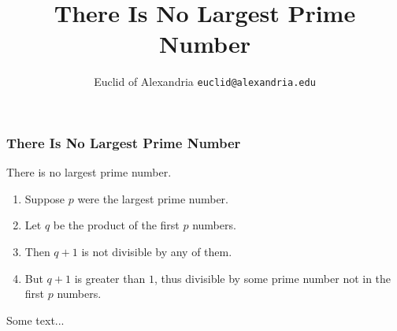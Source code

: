 \documentclass[aspectratio=169,10pt,handout]{beamer}
\title{There Is No Largest Prime Number}
\author[Euclid]{Euclid of Alexandria \texttt{euclid@alexandria.edu}}
\begin{document}
   \maketitle

\begin{frame} 
\frametitle{There Is No Largest Prime Number} 
\begin{theorem}
There is no largest prime number. 
\end{theorem} 
\begin{enumerate} 
\item Suppose $p$ were the largest prime number. 
\item Let $q$ be the product of the first $p$ numbers. 
\item Then $q+1$ is not divisible by any of them. 
\item But $q + 1$ is greater than $1$, thus divisible by some prime
number not in the first $p$ numbers.
\end{enumerate}
\end{frame}

\begin{frame}[t]
Some text...
\end{frame}
% 
\end{document}
